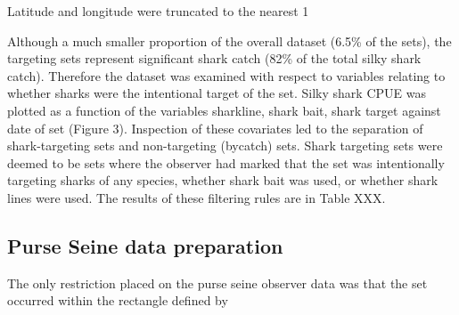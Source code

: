 \documentclass[12pt]{SCreport}
\begin{document}
Latitude and longitude were truncated to the nearest 1%

Although a much smaller proportion of the overall dataset (6.5\% of the sets), the targeting sets represent significant shark catch (82\% of the total silky shark catch). Therefore the dataset was examined with respect to variables relating to whether sharks were the intentional target of the set. Silky shark CPUE was plotted as a function of the variables sharkline, shark bait, shark target against date of set (Figure 3). Inspection of these covariates led to the separation of shark-targeting sets and non-targeting (bycatch) sets. Shark targeting sets were deemed to be sets where the observer had marked that the set was intentionally targeting sharks of any species, whether shark bait was used, or whether shark lines were used. 
The results of these filtering rules are in Table XXX.

\subsection*{Purse Seine data preparation}
The only restriction placed on the purse seine observer data was that the set occurred within the rectangle defined by%



 
\end{document}
